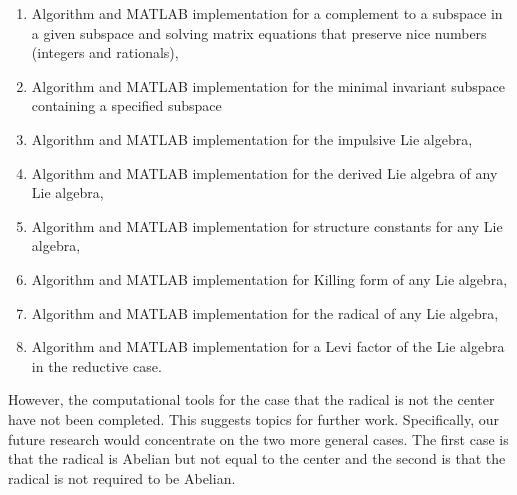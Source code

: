 \documentclass[11pt,a4paper]{article}
\begin{document}
\begin{enumerate}
\item Algorithm and MATLAB implementation for a complement to a subspace in a given subspace and solving matrix equations that preserve nice numbers (integers and rationals),

\item Algorithm and MATLAB implementation for the minimal invariant subspace containing a specified subspace

\item Algorithm and MATLAB implementation for the impulsive Lie algebra,

\item Algorithm and MATLAB implementation for the derived Lie algebra of any Lie algebra,

\item Algorithm and MATLAB implementation for structure constants for any Lie algebra,

\item Algorithm and MATLAB implementation for Killing form of any Lie algebra,

\item Algorithm and MATLAB implementation for the radical of any Lie algebra,

\item Algorithm and MATLAB implementation for a Levi factor of the Lie algebra in the reductive case.
\end{enumerate}

However, the computational tools for the case that the radical is not the center have not been completed. This suggests topics for further work. Specifically, our future research would concentrate on the two more general cases. The first case is that the radical is Abelian but not equal to the center and the second is that the radical is not required to be Abelian. 
\end{document}
